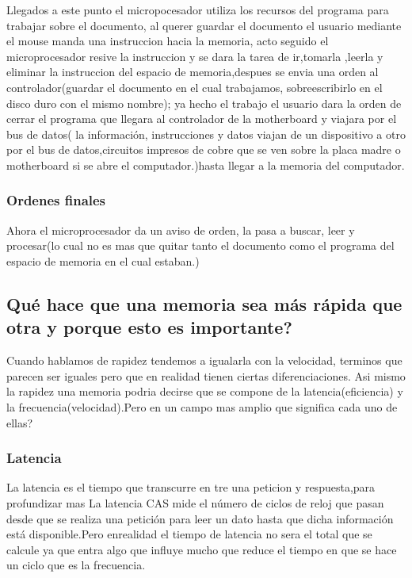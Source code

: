 \documentclass{article}
\begin{document}
        Llegados a este punto el micropocesador utiliza los recursos del programa para trabajar sobre el documento, al querer guardar el documento el usuario mediante el mouse manda una instruccion hacia la memoria, acto seguido el microprocesador resive la instruccion y se dara la tarea de ir,tomarla ,leerla y eliminar la instruccion del espacio de memoria,despues se envia  una orden al controlador(guardar el documento en el cual trabajamos, sobreescribirlo en el disco duro con el mismo nombre); ya hecho el trabajo el usuario dara la orden de cerrar el programa que llegara al controlador de la motherboard y viajara por el bus de datos( la información, instrucciones y datos viajan de un dispositivo a otro por el bus de datos,circuitos impresos de cobre que se ven sobre la placa madre o
        motherboard si se abre el computador.)hasta llegar  a la memoria del computador.\cite{profe}
        
        \subsubsection{Ordenes finales} Ahora el microprocesador da  un aviso de orden, la pasa a buscar, leer y procesar(lo cual no es mas que quitar tanto el documento como el programa del espacio de memoria en el cual estaban.)
        

    \subsection{Qué hace que una memoria sea más rápida que otra y porque esto es importante?}
    
    Cuando hablamos de rapidez tendemos a igualarla con la velocidad, terminos que parecen ser iguales pero que en realidad tienen ciertas diferenciaciones. Asi mismo la rapidez una memoria podria decirse que se compone de la latencia(eficiencia) y la frecuencia(velocidad).Pero en un campo mas amplio que significa cada uno de ellas?
    
    \subsubsection{Latencia} La latencia es el tiempo que transcurre en tre una peticion y respuesta,para profundizar mas La latencia CAS mide el número de ciclos de reloj que pasan desde que se realiza una petición para leer un dato hasta que dicha información está disponible.Pero enrealidad el tiempo de latencia no sera el total que se calcule ya que entra algo que influye mucho que reduce el tiempo en que se hace un ciclo que es la frecuencia.\cite{profesional}
    
\end{document}
